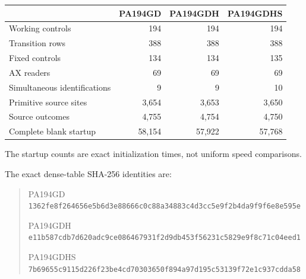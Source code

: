 \begin{center}
\begin{tabular}{lrrr}
\toprule
 & \textsf{PA194GD} & \textsf{PA194GDH} & \textsf{PA194GDHS}\\
\midrule
Working controls & 194 & 194 & 194\\
Transition rows & 388 & 388 & 388\\
Fixed controls & 134 & 134 & 135\\
AX readers & 69 & 69 & 69\\
Simultaneous identifications & 9 & 9 & 10\\
Primitive source sites & 3,654 & 3,653 & 3,650\\
Source outcomes & 4,755 & 4,754 & 4,750\\
Complete blank startup & 58,154 & 57,922 & 57,768\\
\bottomrule
\end{tabular}
\end{center}

The startup counts are exact initialization times, not uniform speed comparisons.

\noindent The exact dense-table SHA-256 identities are:
\begin{quote}\small
\textsf{PA194GD}\\
\texttt{1362fe8f264656e5b6d3e88666c0c88a34883c4d3cc5e9f2b4da9f9f6e8e595e}\par\smallskip
\textsf{PA194GDH}\\
\texttt{e11b587cdb7d620adc9ce086467931f2d9db453f56231c5829e9f8c71c04eed1}\par\smallskip
\textsf{PA194GDHS}\\
\texttt{7b69655c9115d226f23be4cd70303650f894a97d195c53139f72e1c937cdda58}\par\smallskip
\end{quote}
